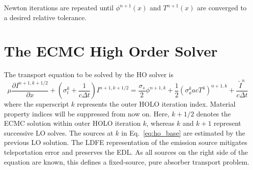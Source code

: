 \documentclass[11pt]{article}
\newcommand{\pderiv}[2]{\frac{\partial #1}{\partial #2}}
\begin{document}
Newton iterations are repeated until $\phi^{n+1}(x)$ and $T^{n+1}(x)$ are converged
to a desired relative tolerance.  



\section{The ECMC High Order Solver}

The transport equation to be solved by the HO solver is
\begin{equation}\label{eq:ho_base}
\mu \pderiv{I^{n+1,k+1/2}}{x} + \left(\sigma_t^k + \frac{1}{c \Delta t }\right)
I^{n+1,k+1/2}
= \frac{\sigma_s}{2} \phi^{n+1,k} +\frac{1}{2} \left(\sigma_a^k a c T^4
\right)^{n+1,k} + \frac{\tilde I^n}{c\Delta t} 
\end{equation}
where the superscript $k$ represents the outer HOLO iteration index.  Material property indices will be
suppressed from now on.  Here, $k+1/2$ denotes the
ECMC solution within outer HOLO iteration $k$, whereas $k$ and $k+1$ represent successive LO
solves. The sources at $k$ in Eq.~\eqref{eq:ho_base} are estimated by the previous LO solution. The LDFE representation of the emission source mitigates teleportation error and
preserves the EDL. As all sources on the right side of the equation are known,
this defines a fixed-source, pure absorber transport problem. 
\end{document}
